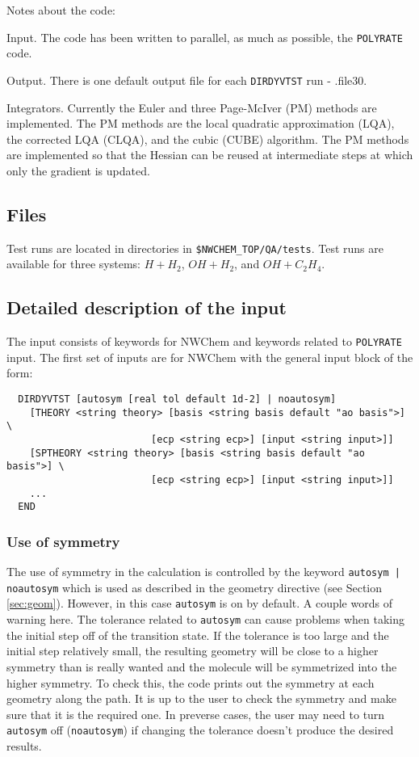 Notes about the code:

Input.  The code has been written to parallel, as much as possible,
the \verb+POLYRATE+ code.  

Output.  There is one default output file for each \verb+DIRDYVTST+ run - .file30.

Integrators.  Currently the Euler and three Page-McIver (PM) methods 
are implemented.  The PM methods are the local quadratic approximation 
(LQA), the corrected LQA (CLQA), and the cubic (CUBE) algorithm.
The PM methods are implemented so that the Hessian can be reused at
intermediate steps at which only the gradient is updated.  


\subsection{Files}

Test runs are located in directories in \verb+$NWCHEM_TOP/QA/tests+.  Test 
runs are available for three systems: $H + H_2$, $OH + H_2$, and $OH + C_2H_4$.


\subsection{Detailed description of the input}

The input consists of keywords for NWChem and keywords related to \verb+POLYRATE+
input.  The first set of inputs are for NWChem with the general input block
of the form:

\begin{verbatim}
  DIRDYVTST [autosym [real tol default 1d-2] | noautosym]
    [THEORY <string theory> [basis <string basis default "ao basis">] \
                         [ecp <string ecp>] [input <string input>]]
    [SPTHEORY <string theory> [basis <string basis default "ao basis">] \
                         [ecp <string ecp>] [input <string input>]]
    ...
  END
\end{verbatim}

\subsubsection{Use of symmetry}
The use of symmetry in the calculation is controlled by the keyword
\verb+autosym | noautosym+ which is used as described in the geometry
directive (see Section \ref{sec:geom}).  However, in this case
\verb+autosym+ is on by default.  A couple words of warning here.
The tolerance related to \verb+autosym+ can cause problems when taking the
initial step off of the transition state.  If the tolerance is too large and
the initial step relatively small,
the resulting geometry will be close to a higher symmetry than is really 
wanted and the molecule will be symmetrized into the higher symmetry.
To check this, the code prints out the symmetry at each geometry along the 
path.  It is up to the user to check the symmetry and make sure that
it is the required one.  In preverse cases, the user may need to turn
\verb+autosym+ off (\verb+noautosym+) if changing the tolerance doesn't
produce the desired results.

